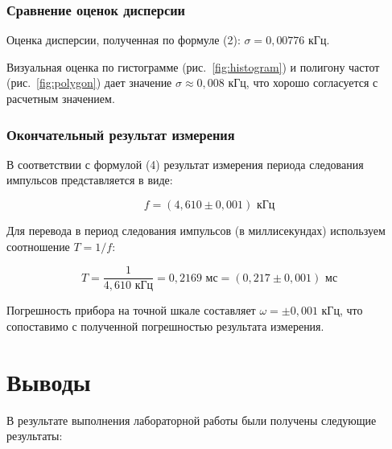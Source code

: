 \subsubsection{Сравнение оценок дисперсии}

Оценка дисперсии, полученная по формуле (2): $\sigma = 0,00776$ кГц.

Визуальная оценка по гистограмме (рис.~\ref{fig:histogram}) и полигону частот (рис.~\ref{fig:polygon}) дает значение $\sigma \approx 0,008$ кГц, что хорошо согласуется с расчетным значением.

\subsubsection{Окончательный результат измерения}

В соответствии с формулой (4) результат измерения периода следования импульсов представляется в виде:

\[
f = (4,610 \pm 0,001) \text{ кГц}
\]

Для перевода в период следования импульсов (в миллисекундах) используем соотношение $T = 1/f$:

\[
T = \frac{1}{4,610 \text{ кГц}} = 0,2169 \text{ мс} = (0,217 \pm 0,001) \text{ мс}
\]

Погрешность прибора на точной шкале составляет $\omega = \pm 0,001$ кГц, что сопоставимо с полученной погрешностью результата измерения.

\section{Выводы}

В результате выполнения лабораторной работы были получены следующие результаты:

